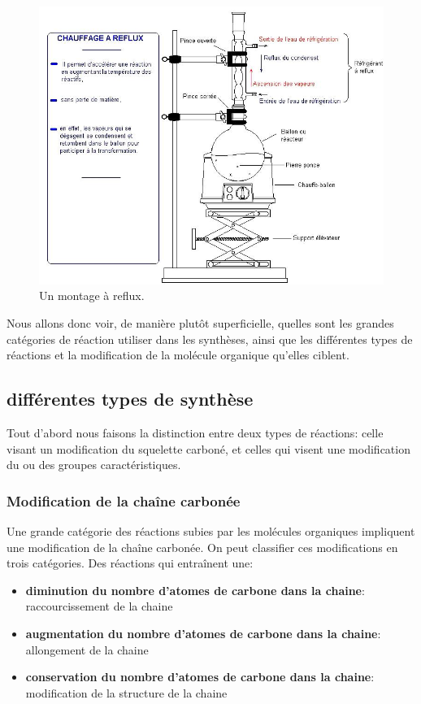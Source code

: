 \documentclass[11pt,a4paper]{article}
\begin{document}
\begin{figure}[h]
    \centering
    \includegraphics[width=\linewidth]{imgs/c5/reflux2.jpg}
    \caption{Un montage à reflux.}
    \label{fig:reflux}
\end{figure}

Nous allons donc voir, de manière plutôt superficielle, quelles sont les grandes catégories de réaction utiliser dans les synthèses, ainsi que les différentes types de réactions et la modification de la molécule organique qu'elles ciblent. 

\subsection{différentes types de synthèse}
Tout d'abord nous faisons la distinction entre deux types de réactions: celle visant un modification du squelette carboné, et celles qui visent une modification du ou des groupes caractéristiques. 

\subsubsection{Modification de la chaîne carbonée}

Une grande catégorie des réactions subies par les molécules organiques impliquent une modification de la chaîne carbonée. On peut classifier ces modifications en trois catégories. Des réactions qui entraînent une: 
\begin{itemize}
    \item \textbf{diminution du nombre d’atomes de carbone dans la chaine}: raccourcissement de la chaine 
    \item \textbf{augmentation du nombre d’atomes de carbone dans la chaine}: allongement de la chaine
    \item \textbf{conservation du nombre d’atomes de carbone dans la chaine}: modification de la structure de la chaine
\end{itemize}
\end{document}
